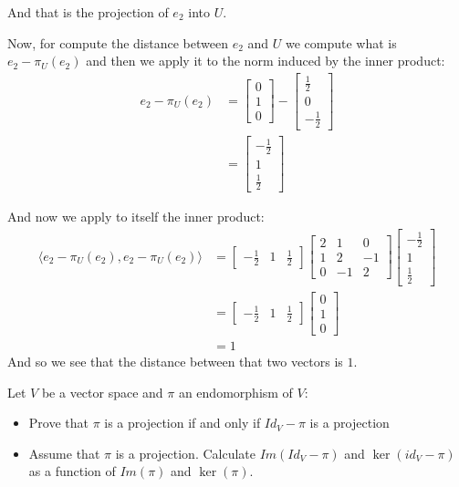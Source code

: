 \documentclass[final,expand]{problemset}
\begin{document}
{	And that is the projection of $e_2$ into $U$.

	Now, for compute the distance between $e_2$ and $U$ we compute what is $e_2 - \pi_U(e_2)$ and then we apply it to the norm induced by the inner product:
	\begin{align*}
		e_2 - \pi_U(e_2) &= \begin{bmatrix}
			0 \\ 1 \\ 0
		\end{bmatrix} - \begin{bmatrix}
			\frac{1}{2} \\ 0\\ -\frac{1}{2}
		\end{bmatrix}\\
		&= \begin{bmatrix}
			-\frac{1}{2} \\ 1 \\ \frac{1}{2}
		\end{bmatrix}
	\end{align*}

	And now we apply to itself the inner product:
	\begin{align*}
		\langle e_2 - \pi_U(e_2), e_2 - \pi_U(e_2)\rangle &= \begin{bmatrix}
			-\frac{1}{2} & 1 & \frac{1}{2}
		\end{bmatrix}\begin{bmatrix}
			2 & 1 & 0\\ 1 & 2 & -1\\ 0 & -1 & 2
		\end{bmatrix}\begin{bmatrix}
			-\frac{1}{2} \\ 1 \\ \frac{1}{2}
		\end{bmatrix}\\
		&= \begin{bmatrix}
			-\frac{1}{2} & 1 & \frac{1}{2}
		\end{bmatrix} \begin{bmatrix}
			0 \\ 1\\ 0
		\end{bmatrix}\\
		&= 1
	\end{align*}
	And so we see that the distance between that two vectors is $1$. 

}

\problem Let $V$ be a vector space and $\pi$ an endomorphism of $V$:
\begin{itemize}
	\item Prove that $\pi$ is a projection if and only if $Id_V - \pi$ is a projection
	\item Assume that $\pi$ is a projection. Calculate $Im(Id_V - \pi)$ and $\ker(id_V - \pi)$ as a function of $Im(\pi)$ and $\ker(\pi)$.
\end{itemize}
\end{document}
